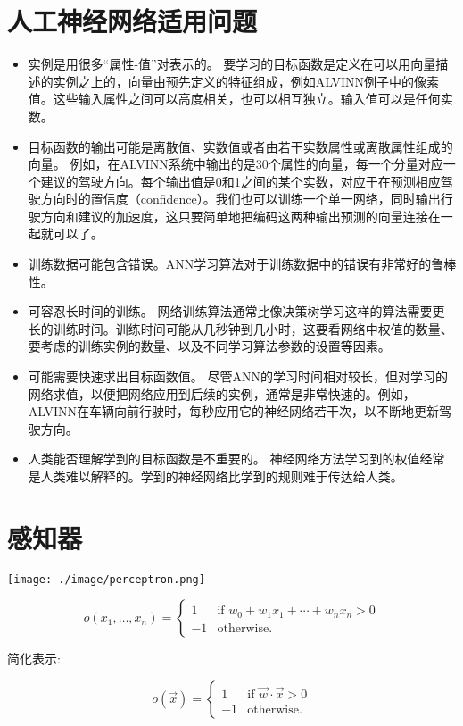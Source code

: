 \documentclass{article}
\begin{document}
\section{人工神经网络适用问题}
\label{sec-2}


\begin{itemize}
\item 实例是用很多“属性-值”对表示的。
  要学习的目标函数是定义在可以用向量描述的实例之上的，向量由预先定义的特征组成，例如ALVINN例子中的像素值。这些输入属性之间可以高度相关，也可以相互独立。输入值可以是任何实数。
\item 目标函数的输出可能是离散值、实数值或者由若干实数属性或离散属性组成的向量。
  例如，在ALVINN系统中输出的是30个属性的向量，每一个分量对应一个建议的驾驶方向。每个输出值是0和1之间的某个实数，对应于在预测相应驾驶方向时的置信度（confidence）。我们也可以训练一个单一网络，同时输出行驶方向和建议的加速度，这只要简单地把编码这两种输出预测的向量连接在一起就可以了。
\item 训练数据可能包含错误。ANN学习算法对于训练数据中的错误有非常好的鲁棒性。
\item 可容忍长时间的训练。
  网络训练算法通常比像决策树学习这样的算法需要更长的训练时间。训练时间可能从几秒钟到几小时，这要看网络中权值的数量、要考虑的训练实例的数量、以及不同学习算法参数的设置等因素。
\item 可能需要快速求出目标函数值。
  尽管ANN的学习时间相对较长，但对学习的网络求值，以便把网络应用到后续的实例，通常是非常快速的。例如，ALVINN在车辆向前行驶时，每秒应用它的神经网络若干次，以不断地更新驾驶方向。
\item 人类能否理解学到的目标函数是不重要的。
  神经网络方法学习到的权值经常是人类难以解释的。学到的神经网络比学到的规则难于传达给人类。
\end{itemize}
\section{感知器}
\label{sec-3}


\texttt{[image: ./image/perceptron.png]}

\[o(x_{1}, \ldots, x_{n}) = \left\{ \begin{array}{rl}
     1 & \mbox{if $w_{0} + w_{1}x_1 + \cdots + w_n x_n > 0$}\\
     -1 & \mbox{otherwise.}  
\end{array}
\right. \]

简化表示:

\[
o(\vec{x}) = \left\{ \begin{array}{rl}
     1 & \mbox{if $\vec{w} \cdot \vec{x} > 0$}\\
     -1 & \mbox{otherwise.}  
\end{array}
\right. 
\]
\end{document}
